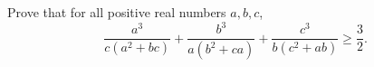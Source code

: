 Prove that for all positive real numbers $a,b,c$,
\[\dfrac{a^3}{c(a^2+bc)}+\dfrac{b^3}{a(b^2+ca)}+\dfrac{c^3}{b(c^2+ab)}\ge\dfrac{3}{2} .\]
